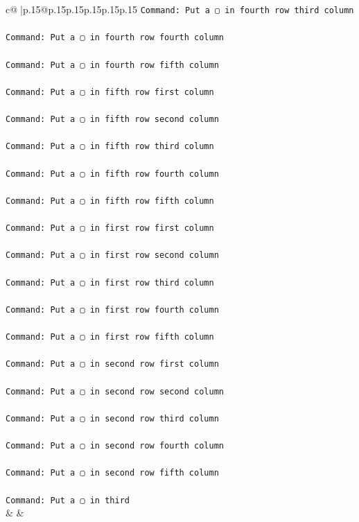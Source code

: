 \documentclass{article}
\begin{document}
{\begin{supertabular}{c@{$\;$}|p{.15\linewidth}@{}p{.15\linewidth}p{.15\linewidth}p{.15\linewidth}p{.15\linewidth}p{.15\linewidth}}
{{{\texttt{Command: Put a ▢ in fourth row third column} \\
\\ 
\texttt{Command: Put a ▢ in fourth row fourth column} \\
\\ 
\texttt{Command: Put a ▢ in fourth row fifth column} \\
\\ 
\texttt{Command: Put a ▢ in fifth row first column} \\
\\ 
\texttt{Command: Put a ▢ in fifth row second column} \\
\\ 
\texttt{Command: Put a ▢ in fifth row third column} \\
\\ 
\texttt{Command: Put a ▢ in fifth row fourth column} \\
\\ 
\texttt{Command: Put a ▢ in fifth row fifth column} \\
\\ 
\texttt{Command: Put a ▢ in first row first column} \\
\\ 
\texttt{Command: Put a ▢ in first row second column} \\
\\ 
\texttt{Command: Put a ▢ in first row third column} \\
\\ 
\texttt{Command: Put a ▢ in first row fourth column} \\
\\ 
\texttt{Command: Put a ▢ in first row fifth column} \\
\\ 
\texttt{Command: Put a ▢ in second row first column} \\
\\ 
\texttt{Command: Put a ▢ in second row second column} \\
\\ 
\texttt{Command: Put a ▢ in second row third column} \\
\\ 
\texttt{Command: Put a ▢ in second row fourth column} \\
\\ 
\texttt{Command: Put a ▢ in second row fifth column} \\
\\ 
\texttt{Command: Put a ▢ in third} \\
            }
        }
    }
    & & \\ \\


\end{supertabular}}
\end{document}
